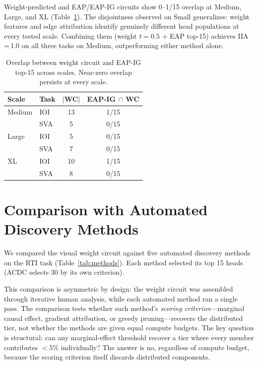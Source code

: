 \documentclass{article}
\begin{document}
Weight-predicted and EAP/EAP-IG circuits show 0--1/15 overlap at
Medium, Large, and XL (Table~\ref{tab:overlap_scale}). The disjointness
observed on Small generalizes: weight features and edge attribution
identify genuinely different head populations at every tested scale.
Combining them (weight $t{=}0.5$ + EAP top-15) achieves IIA\,=\,1.0
on all three tasks on Medium, outperforming either method alone.

\begin{table}[h]
\centering
\caption{Overlap between weight circuit and EAP-IG top-15 across
  scales. Near-zero overlap persists at every scale.}
\label{tab:overlap_scale}
\small
\begin{tabular}{llcc}
\toprule
\textbf{Scale} & \textbf{Task} & $|$\textbf{WC}$|$ & \textbf{EAP-IG $\cap$ WC} \\
\midrule
Medium & IOI & 13 & 1/15 \\
       & SVA & 5 & 0/15 \\
Large  & IOI & 5 & 0/15 \\
       & SVA & 7 & 0/15 \\
XL     & IOI & 10 & 1/15 \\
       & SVA & 8 & 0/15 \\
\bottomrule
\end{tabular}
\end{table}


\section{Comparison with Automated Discovery Methods}
\label{sec:comparison}

We compared the visual weight circuit against five automated discovery
methods on the RTI task (Table~\ref{tab:methods}). Each method selected
its top 15 heads (ACDC selects 30 by its own criterion).

This comparison is asymmetric by design: the weight circuit was
assembled through iterative human analysis, while each automated
method ran a single pass. The comparison tests whether each method's
\emph{scoring criterion}---marginal causal effect, gradient
attribution, or greedy pruning---recovers the distributed tier, not
whether the methods are given equal compute budgets. The key question
is structural: can any marginal-effect threshold recover a tier
where every member contributes $<5\%$ individually? The answer is no,
regardless of compute budget, because the scoring criterion itself
discards distributed components.
\end{document}

